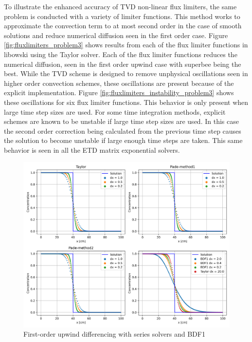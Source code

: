 To illustrate the enhanced accuracy of TVD non-linear flux limiters, the same problem is conducted with a variety of limiter functions. This method works to approximate the convection term to at most second order in the case of smooth solutions and reduce numerical diffusion seen in the first order case. Figure \ref{fig:fluxlimiters_problem3} shows results from each of the flux limiter functions in libowski using the Taylor solver. Each of the flux limiter functions reduces the numerical diffusion, seen in the first order upwind case with superbee being the best. While the TVD scheme is designed to remove unphysical oscillations seen in higher order convection schemes, these oscillations are present because of the explicit implementation. Figure \ref{fig:fluxlimiters_instability_problem3} shows these oscillations for six flux limiter functions. This behavior is only present when large time step sizes are used. For some time integration methods, explicit schemes are known to be unstable if large time step sizes are used. In this case the second order correction being calculated from the previous time step causes the solution to become unstable if large enough time steps are taken. This same behavior is seen in all the ETD matrix exponential solvers. 

\clearpage

\begin{figure}[p]
    \centering
    \includegraphics[width=6in]{images/chapter-5/progressionProblems/problem3/problem3FirstOrder.png}
    \caption{First-order upwind differencing with series solvers and BDF1}
    \label{fig:first_order_results}
\end{figure}

